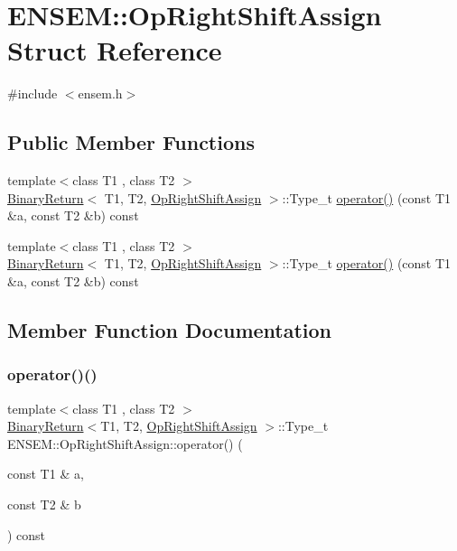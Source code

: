 \hypertarget{structENSEM_1_1OpRightShiftAssign}{}\section{E\+N\+S\+EM\+:\+:Op\+Right\+Shift\+Assign Struct Reference}
\label{structENSEM_1_1OpRightShiftAssign}


{\ttfamily \#include $<$ensem.\+h$>$}

\subsection*{Public Member Functions}
\begin{DoxyCompactItemize}
\item 
{\footnotesize template$<$class T1 , class T2 $>$ }\\\mbox{\hyperlink{structENSEM_1_1BinaryReturn}{Binary\+Return}}$<$ T1, T2, \mbox{\hyperlink{structENSEM_1_1OpRightShiftAssign}{Op\+Right\+Shift\+Assign}} $>$\+::Type\+\_\+t \mbox{\hyperlink{structENSEM_1_1OpRightShiftAssign_a9ff0eba54a134afd57441ec8450a745e}{operator()}} (const T1 \&a, const T2 \&b) const
\item 
{\footnotesize template$<$class T1 , class T2 $>$ }\\\mbox{\hyperlink{structENSEM_1_1BinaryReturn}{Binary\+Return}}$<$ T1, T2, \mbox{\hyperlink{structENSEM_1_1OpRightShiftAssign}{Op\+Right\+Shift\+Assign}} $>$\+::Type\+\_\+t \mbox{\hyperlink{structENSEM_1_1OpRightShiftAssign_a9ff0eba54a134afd57441ec8450a745e}{operator()}} (const T1 \&a, const T2 \&b) const
\end{DoxyCompactItemize}


\subsection{Member Function Documentation}
\mbox{\label{structENSEM_1_1OpRightShiftAssign_a9ff0eba54a134afd57441ec8450a745e}} 
\subsubsection{\texorpdfstring{operator()()}{operator()()}\hspace{0.1cm}{\footnotesize\ttfamily [1/2]}}
{\footnotesize\ttfamily template$<$class T1 , class T2 $>$ \\
\mbox{\hyperlink{structENSEM_1_1BinaryReturn}{Binary\+Return}}$<$T1, T2, \mbox{\hyperlink{structENSEM_1_1OpRightShiftAssign}{Op\+Right\+Shift\+Assign}} $>$\+::Type\+\_\+t E\+N\+S\+E\+M\+::\+Op\+Right\+Shift\+Assign\+::operator() (\begin{DoxyParamCaption}\item[{const T1 \&}]{a,  }\item[{const T2 \&}]{b }\end{DoxyParamCaption}) const\hspace{0.3cm}{\ttfamily [inline]}}

